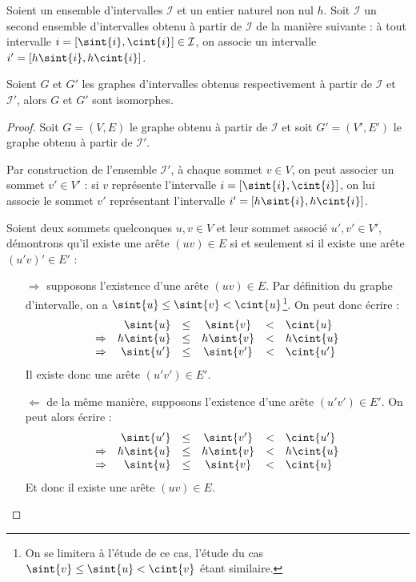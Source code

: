 \begin{nlemma}
    Soient un ensemble d'intervalles $\mathcal{I}$ et un entier naturel non nul $h$. Soit $\mathcal{I}$ un second
    ensemble d'intervalles obtenu à partir de $\mathcal{I}$ de la manière suivante : à tout
    intervalle $i = [\sint{i}, \cint{i}] \in \mathcal{I}$, on associe un intervalle $i' =
    [h\sint{i}, h\cint{i}]$.

    Soient $G$ et $G'$ les graphes d'intervalles obtenus respectivement à partir de $\mathcal{I}$ et
    $\mathcal{I}'$, alors $G$ et $G'$ sont isomorphes.
\end{nlemma}
\begin{proof}
    Soit $G=(V,E)$ le graphe obtenu à partir de $\mathcal{I}$ et soit $G'=(V',E')$ le graphe obtenu
    à partir de $\mathcal{I}'$. 

    Par construction de l'ensemble $\mathcal{I}'$, à chaque sommet $v \in V$, on peut associer un
    sommet $v' \in V'$ : si $v$ représente l'intervalle $i = [\sint{i}, \cint{i}]$, on lui associe
    le sommet $v'$ représentant l'intervalle $i' = [h\sint{i}, h\cint{i}]$.
    
    Soient deux sommets quelconques $u,v \in V$ et leur sommet associé $u', v' \in V'$, démontrons
    qu'il existe une arête $(uv) \in E$ si et seulement si il existe une arête $(u'v)' \in E'$ :
    \begin{itemize}
        \item[$\Rightarrow$] supposons l'existence d'une arête $(uv) \in E$. Par définition du
            graphe d'intervalle, on a $\sint{u} \leq \sint{v} < \cint{u}$\footnote{On se limitera à
                l'étude de ce cas, l'étude du cas $\sint{v} \leq \sint{u} < \cint{v}$ étant
            similaire.}. On peut donc écrire : \[
                \begin{array}{rrcccl}
                     & \sint{u} & \leq & \sint{v} & < & \cint{u} \\
                    \Rightarrow & h\sint{u} & \leq & h\sint{v} & < & h\cint{u} \\
                    \Rightarrow & \sint{u'} & \leq & \sint{v'} & < & \cint{u'} \\
                \end{array}
            \]
            Il existe donc une arête $(u'v') \in E'$.
        \item[$\Leftarrow$] de la même manière, supposons l'existence d'une arête $(u'v') \in E'$.
            On peut alors écrire : \[
                \begin{array}{rrcccl}
                     & \sint{u'} & \leq & \sint{v'} & < & \cint{u'} \\
                    \Rightarrow & h\sint{u} & \leq & h\sint{v} & < & h\cint{u} \\
                    \Rightarrow & \sint{u} & \leq & \sint{v} & < & \cint{u} \\
                \end{array}
            \]
            Et donc il existe une arête $(uv) \in E$.
    \end{itemize}
\end{proof}
